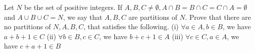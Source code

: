 Let $N$ be the set of positive integers.
If $A,B,C \ne \emptyset, A \cap B = B \cap C = C \cap A = \emptyset$ and $A \cup B \cup C = N$, we say that $A,B,C$ are partitions of $N$. Prove that there are no partitions of $N, A,B,C$, that satisfies the following.
(i) $\forall a \in A, b \in B$, we have $a + b + 1 \in C$
(ii) $\forall  b \in B, c \in C$, we have $b + c + 1 \in A$
(iii) $\forall  c \in C, a \in A$, we have $c + a + 1 \in B$